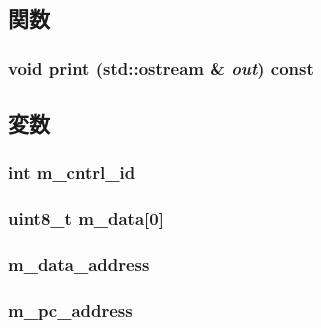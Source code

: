 \subsection{関数}
\hypertarget{classTraceRecord_ac55fe386a101fbae38c716067c9966a0}{
\subsubsection[{print}]{\setlength{\rightskip}{0pt plus 5cm}void print (std::ostream \& {\em out}) const}}
\label{classTraceRecord_ac55fe386a101fbae38c716067c9966a0}


\subsection{変数}
\hypertarget{classTraceRecord_adfea059f9e1d33d6f5a0a4e708c46c8f}{
\subsubsection[{m\_\-cntrl\_\-id}]{\setlength{\rightskip}{0pt plus 5cm}int {\bf m\_\-cntrl\_\-id}}}
\label{classTraceRecord_adfea059f9e1d33d6f5a0a4e708c46c8f}
\hypertarget{classTraceRecord_af36fa4044467f20981e9d20dc30ba7ae}{
\subsubsection[{m\_\-data}]{\setlength{\rightskip}{0pt plus 5cm}uint8\_\-t {\bf m\_\-data}\mbox{[}0\mbox{]}}}
\label{classTraceRecord_af36fa4044467f20981e9d20dc30ba7ae}
\hypertarget{classTraceRecord_ae231e39884db0f164a32dfcccdf96ca8}{
\subsubsection[{m\_\-data\_\-address}]{ {\bf m\_\-data\_\-address}}}
\label{classTraceRecord_ae231e39884db0f164a32dfcccdf96ca8}
\hypertarget{classTraceRecord_af4c389aff33304e09db4ca9fe19764de}{
\subsubsection[{m\_\-pc\_\-address}]{ {\bf m\_\-pc\_\-address}}}
